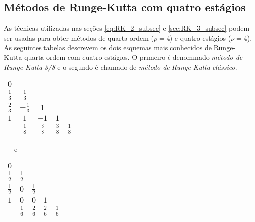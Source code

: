 \subsection{Métodos de Runge-Kutta com quatro estágios}\label{ssec:RK_4_subsec}
As técnicas utilizadas nas seções \ref{eq:RK_2_subsec}  e \ref{sec:RK_3_subsec} podem ser usadas para obter métodos de quarta ordem ($p=4$) e quatro estágios ($\nu=4$). As seguintes tabelas descrevem os dois esquemas mais conhecidos de Runge-Kutta quarta ordem com quatro estágios. O primeiro é denominado \emph{método de Runge-Kutta 3/8} e o segundo é chamado de \emph{método de Runge-Kutta clássico}.

\begin{center}
\begin{tabular}{c|cccc}
  $0$ 		&     			&   		&   		&    \\
  $\frac{1}{3}$ & $\frac{1}{3}$ 	&   		&   		&    \\
  $\frac{2}{3}$ & $-\frac{1}{3}$ 	&$1$		&   		&    \\
  $1$ 		& $1$ 			&$-1$		&$1$		&    \\  \hline
		& $\frac{1}{8}$ 	&$\frac{3}{8}$	& $\frac{3}{8}$	& $\frac{1}{8}$
\end{tabular}
~~~\hbox{e}~~~~~~~
\begin{tabular}{c|cccc}
  $0$ 		&     			&   		&   		&    \\
  $\frac{1}{2}$ & $\frac{1}{2}$ 	&   		&   		&    \\
  $\frac{1}{2}$ & $0$ 			&$\frac{1}{2}$	&   		&    \\
  $1$ 		& $0$ 			&$0$		&$1$		&    \\  \hline
		& $\frac{1}{6}$ 	&$\frac{2}{6}$	& $\frac{2}{6}$	& $\frac{1}{6}$
\end{tabular}
\end{center}

